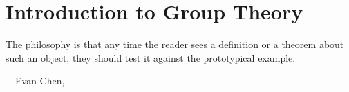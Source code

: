 \documentclass[../main.tex]{subfiles}
\begin{document}
\chapter{Introduction to Group Theory} \label{ch:grp}
\epigraph{The philosophy is that any time the reader sees a definition or a theorem about such an object, they should test it against the prototypical example.}
{---Evan Chen, \cite{napkin}}

% 



\end{document}
